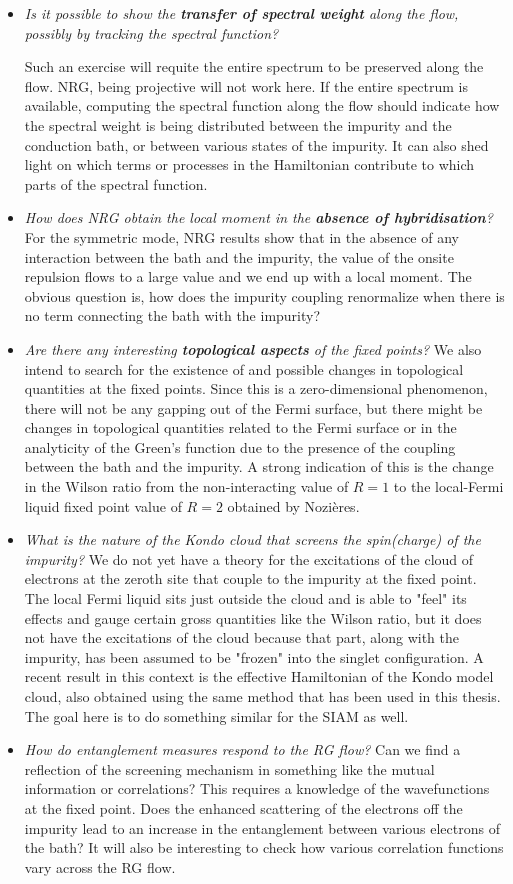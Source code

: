 \begin{itemize}
    \item \textit{Is it possible to show the \textbf{transfer of spectral weight} along the flow, possibly by tracking the spectral function?}

	    Such an exercise will requite the entire spectrum to be preserved along the flow. NRG, being projective will not work here. If the entire spectrum is available, computing the spectral function along the flow should indicate how the spectral weight is being distributed between the impurity and the conduction bath, or between various states of the impurity. It can also shed light on which terms or processes in the Hamiltonian contribute to which parts of the spectral function.
    \item \textit{How does NRG obtain the local moment in the \textbf{absence of hybridisation}?}
    For the symmetric mode, NRG results show that in the absence of any interaction between the bath and the impurity, the value of the onsite repulsion flows to a large value and we end up with a local moment. The obvious question is, how does the impurity coupling renormalize when there is no term connecting the bath with the impurity?
    \item \textit{Are there any interesting \textbf{topological aspects} of the fixed points?}
	    We also intend to search for the existence of and possible changes in topological quantities at the fixed points. Since this is a zero-dimensional phenomenon, there will not be any gapping out of the Fermi surface, but there might be changes in topological quantities related to the Fermi surface or in the analyticity of the Green's function due to the presence of the coupling between the bath and the impurity. A strong indication of this is the change in the Wilson ratio from the non-interacting value of \(R=1\) to the local-Fermi liquid fixed point value of \(R=2\) obtained by Nozières\cite{nozieres_1974}. 
    \item \textit{What is the nature of the Kondo cloud that screens the spin(charge) of the impurity?} We do not yet have a theory for the excitations of the cloud of electrons at the zeroth site that couple to the impurity at the fixed point. The local Fermi liquid sits just outside the cloud and is able to "feel" its effects and gauge certain gross quantities like the Wilson ratio, but it does not have the excitations of the cloud because that part, along with the impurity, has been assumed to be "frozen" into the singlet configuration. A recent result in this context \cite{kondo_urg} is the effective Hamiltonian of the Kondo model cloud, also obtained using the same method that has been used in this thesis. The goal here is to do something similar for the SIAM as well.
    \item \textit{How do entanglement measures respond to the RG flow?} Can we find a reflection of the screening mechanism in something like the mutual information or correlations? This requires a knowledge of the wavefunctions at the fixed point. Does the enhanced scattering of the electrons off the impurity lead to an increase in the entanglement between various electrons of the bath? It will also be interesting to check how various correlation functions vary across the RG flow.
\end{itemize}
